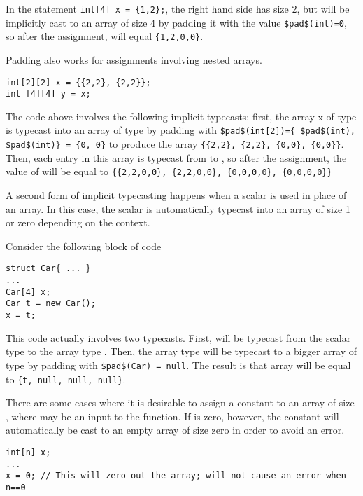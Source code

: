 \begin{Example}
In the statement \lstinline!int[4] x = {1,2};!, the right hand side has size 2, but will be implicitly cast to an array of size 4 by padding it with the value \lstinline!$pad$(int)=0!, so after the assignment,  will equal \lstinline!{1,2,0,0}!.
\end{Example}


\begin{Example}
Padding also works for assignments involving nested arrays.
\begin{lstlisting}
int[2][2] x = {{2,2}, {2,2}};
int [4][4] y = x;
\end{lstlisting}

The code above involves the following implicit typecasts: first, the array x of type  is typecast into an array of type  by padding with \lstinline!$pad$(int[2])={ $pad$(int), $pad$(int)} = {0, 0}! to produce the array \lstinline!{{2,2}, {2,2}, {0,0}, {0,0}}!. Then, each entry in this array is typecast from  to , so after the assignment, the value of  will be equal to \lstinline!{{2,2,0,0}, {2,2,0,0}, {0,0,0,0}, {0,0,0,0}}!
\end{Example}


A second form of implicit typecasting happens when a scalar is used in place of an array. In this case, the scalar is automatically typecast into an array of size 1 or zero depending on the context.

\begin{Example}
Consider the following block of code 
\begin{lstlisting}
struct Car{ ... }
...
Car[4] x;
Car t = new Car();
x = t;
\end{lstlisting}
This code actually involves two typecasts. First,  will be typecast from the scalar type  to the array type . Then, the array type  will be typecast to a bigger array of type  by padding with \lstinline!$pad$(Car) = null!. The result is that array will be equal to \lstinline!{t, null, null, null}!.
\end{Example}

There are some cases where it is desirable to assign a constant to an array of size , where  may be an input to the function. If  is zero, however, the constant will automatically be cast to an empty array of size zero in order to avoid an error.

\begin{Example}
\begin{lstlisting}
int[n] x;
...
x = 0; // This will zero out the array; will not cause an error when n==0
\end{lstlisting}
\end{Example}


